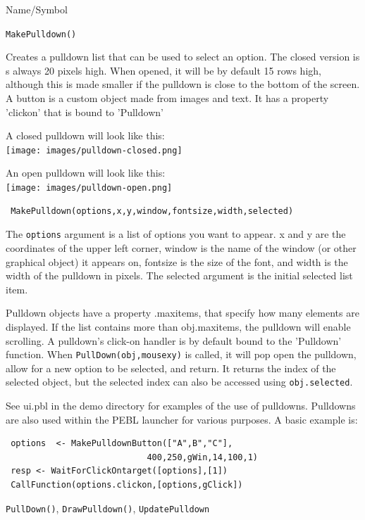 \begin{desc}{Name/Symbol}
\item[Name/Symbol]  	\verb+MakePulldown()+

\item[Description]	
Creates a pulldown list that can be used to select an option. The closed version is s always 20 pixels high. When opened, it will be by default 15 rows high, although this is made smaller if the pulldown is close to the bottom of the screen.
A button is a custom object made from images and text. It has a property 'clickon' that is bound to 'Pulldown'

A closed pulldown will look like this:\\
 \texttt{[image: images/pulldown-closed.png]}

An open pulldown will look like this:\\
 \texttt{[image: images/pulldown-open.png]}

\item[Usage]
\begin{verbatim}
 MakePulldown(options,x,y,window,fontsize,width,selected)
 \end{verbatim}

The \texttt{options} argument is a list of options you want to appear.  x and y are the coordinates of the upper left corner, window is the name of the window (or other graphical object) it appears on, fontsize is the size of the font, and width is the width of the pulldown in pixels.  The selected argument is the initial selected list item.

Pulldown objects have a property .maxitems, that specify how many elements are displayed.  If the list contains more than obj.maxitems, the pulldown will enable scrolling.  A pulldown's click-on handler is by default bound to the 'Pulldown' function. When \texttt{PullDown(obj,mousexy)} is called, it will pop open the pulldown, allow for a new option to be selected, and return. It returns the index of the selected object, but the selected index can also be accessed using \texttt{obj.selected}. 

\item[Example]      	
See ui.pbl in the demo directory for examples of the use of pulldowns.  Pulldowns are also used within the PEBL launcher for various purposes.  A basic example is:

\begin{verbatim}
 options  <- MakePulldownButton(["A",B","C"],
                            400,250,gWin,14,100,1)
 resp <- WaitForClickOntarget([options],[1])
 CallFunction(options.clickon,[options,gClick]) 
\end{verbatim}

\item[See Also]	\verb+PullDown()+, \verb+DrawPulldown()+, \verb+UpdatePulldown+
\end{desc}



